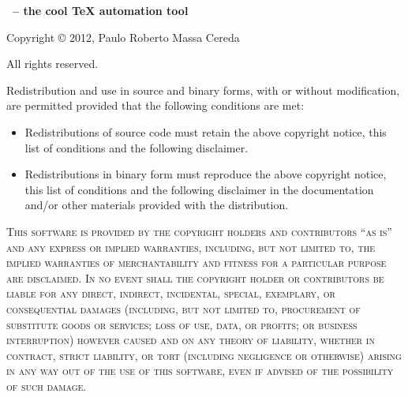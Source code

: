 \documentclass[a4paper,twoside,12pt]{memoir}
\begin{document}
\begin{mdframed}[roundcorner=10pt,linecolor=araracolor,middlelinewidth=1pt]
\noindent
\begingroup
  \color{araracolor}\bfseries
  \arara \ -- the cool \TeX{} automation tool
\endgroup

\vspace{.5em}

\noindent Copyright \copyright{} 2012, Paulo Roberto Massa Cereda

\noindent All rights reserved.

\vspace{1em}

\noindent Redistribution and use in source and binary forms, with or without
modification, are permitted provided that the following conditions are met:

\vspace{1em}

\begin{itemize}
\item Redistributions of source code must retain the above copyright notice, 
      this list of conditions and the following disclaimer.
\item Redistributions in binary form must reproduce the above copyright notice,
      this list of conditions and the following disclaimer in the documentation
      and/or other materials provided with the distribution.
\end{itemize}

\vspace{1em}

\noindent\textsc{This software is provided by the copyright holders and 
contributors ``as is'' and any express or implied warranties, including, but not
 limited to, the implied warranties of merchantability and fitness for a 
particular purpose are disclaimed. In no event shall the copyright holder or 
contributors be liable for any direct, indirect, incidental, special, exemplary,
 or consequential damages (including, but not limited to, procurement of 
substitute goods or services; loss of use, data, or profits; or business 
interruption) however caused and on any theory of liability, whether in contract,
 strict liability, or tort (including negligence or otherwise) arising in any 
way out of the use of this software, even if advised of the possibility of such
damage.}
\end{mdframed}

\cleardoublepage
\end{document}
